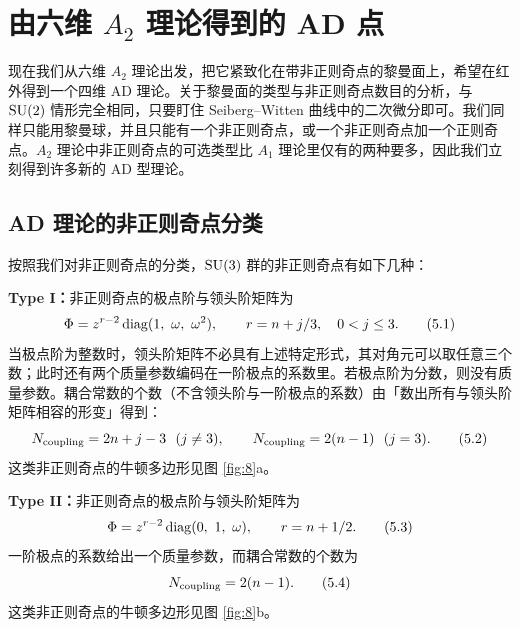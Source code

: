 \section{由六维 $A_2$ 理论得到的 AD 点}
\label{sec:a2}

现在我们从六维 $A_2$ 理论出发，把它紧致化在带非正则奇点的黎曼面上，希望在红外得到一个四维 AD 理论。关于黎曼面的类型与非正则奇点数目的分析，与 $\operatorname{SU}(2)$ 情形完全相同，只要盯住 Seiberg--Witten 曲线中的二次微分即可。我们同样只能用黎曼球，并且只能有一个非正则奇点，或一个非正则奇点加一个正则奇点。$A_2$ 理论中非正则奇点的可选类型比 $A_1$ 理论里仅有的两种要多，因此我们立刻得到许多新的 AD 型理论。

\subsection{AD 理论的非正则奇点分类}
\label{sec:5.1}

按照我们对非正则奇点的分类，$\operatorname{SU}(3)$ 群的非正则奇点有如下几种：

\textbf{Type I：}非正则奇点的极点阶与领头阶矩阵为
\begin{equation}
\Phi = z^{r-2}\operatorname{diag}(1,\ \omega,\ \omega^2),\qquad r = n + j/3,\quad 0<j\le 3 .
\label{eq:5.1}\tag{5.1}
\end{equation}
当极点阶为整数时，领头阶矩阵不必具有上述特定形式，其对角元可以取任意三个数；此时还有两个质量参数编码在一阶极点的系数里。若极点阶为分数，则没有质量参数。耦合常数的个数（不含领头阶与一阶极点的系数）由「数出所有与领头阶矩阵相容的形变」得到：
\begin{equation}
N_{\text{coupling}} = 2n+j-3\ \ (j\ne 3),\qquad
N_{\text{coupling}} = 2(n-1)\ \ (j = 3).
\label{eq:5.2}\tag{5.2}
\end{equation}
这类非正则奇点的牛顿多边形见图 \ref{fig:8}a。

\textbf{Type II：}非正则奇点的极点阶与领头阶矩阵为
\begin{equation}
\Phi = z^{r-2}\operatorname{diag}(0,\ 1,\ \omega),\qquad r = n + 1/2 .
\label{eq:5.3}\tag{5.3}
\end{equation}
一阶极点的系数给出一个质量参数，而耦合常数的个数为
\begin{equation}
N_{\text{coupling}} = 2(n-1).
\label{eq:5.4}\tag{5.4}
\end{equation}
这类非正则奇点的牛顿多边形见图 \ref{fig:8}b。

